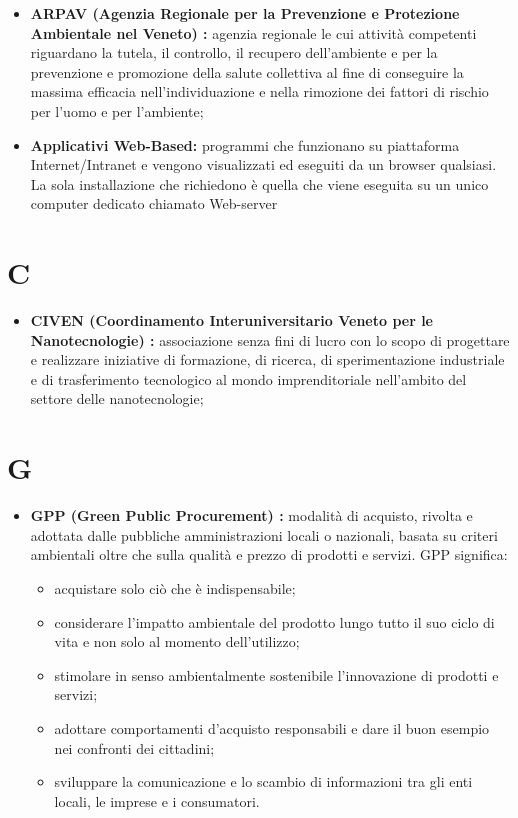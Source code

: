 \documentclass[11pt]{book}              %
\begin{document}
\begin{itemize}
	\item \textbf{{\color{OliveGreen}ARPAV} (Agenzia Regionale per la Prevenzione e Protezione Ambientale nel Veneto) :} agenzia regionale le cui attività competenti riguardano la tutela, il controllo, il recupero dell'ambiente e per la prevenzione e promozione della salute collettiva al fine di conseguire la massima efficacia nell'individuazione e nella rimozione dei fattori di rischio per l'uomo e per l'ambiente;
	\item \textbf{{\color{Plum} Applicativi Web-Based}:}  programmi che funzionano su piattaforma Internet/Intranet e vengono visualizzati ed eseguiti da un browser qualsiasi. La sola installazione che richiedono è quella che viene eseguita su un unico computer dedicato chiamato Web-server
\end{itemize}

\section*{C}
\begin{itemize}

	\item \textbf{{\color{OliveGreen}CIVEN} (Coordinamento Interuniversitario Veneto per le Nanotecnologie) :} associazione senza fini di lucro con lo scopo di progettare e realizzare iniziative di formazione, di ricerca, di sperimentazione industriale e di trasferimento tecnologico al mondo imprenditoriale nell'ambito del settore delle nanotecnologie;

\end{itemize}

\section*{G}
\begin{itemize}

	\item \textbf{{\color{OliveGreen}GPP} (Green Public Procurement) :} modalità di acquisto, rivolta e adottata dalle pubbliche amministrazioni locali o nazionali, basata su criteri ambientali oltre che sulla qualità e prezzo di prodotti e servizi. 
	GPP significa:
	\begin{itemize}
		\item acquistare solo ciò che è indispensabile;
	 	\item considerare l’impatto ambientale del prodotto lungo tutto il suo ciclo di vita e non solo al momento dell’utilizzo;
    		\item stimolare in senso ambientalmente sostenibile l’innovazione di prodotti e servizi;
    		\item adottare comportamenti d’acquisto responsabili e dare il buon esempio nei confronti dei cittadini;
    		\item sviluppare la comunicazione e lo scambio di informazioni tra gli enti locali, le imprese e i consumatori.
	\end{itemize}

\end{itemize}
\end{document}
